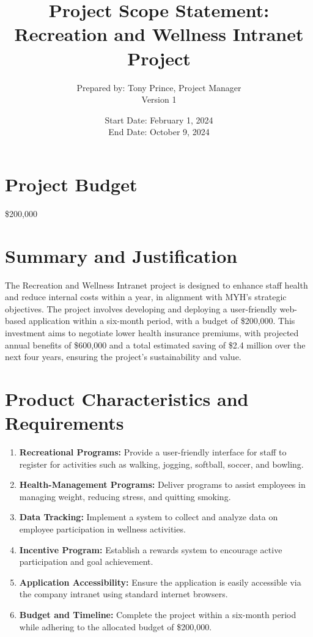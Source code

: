 \documentclass{article}
\title{Project Scope Statement: Recreation and Wellness Intranet Project}
\author{Prepared by: Tony Prince, Project Manager \\ Version 1}
\date{Start Date: February 1, 2024 \\ End Date: October 9, 2024}
\begin{document}
\maketitle

\section*{Project Budget}
\$200,000

\section*{Summary and Justification}
The Recreation and Wellness Intranet project is designed to enhance staff health and reduce internal costs within a year, in alignment with MYH's strategic objectives. The project involves developing and deploying a user-friendly web-based application within a six-month period, with a budget of \$200,000. This investment aims to negotiate lower health insurance premiums, with projected annual benefits of \$600,000 and a total estimated saving of \$2.4 million over the next four years, ensuring the project's sustainability and value.

\section*{Product Characteristics and Requirements}
\begin{enumerate}[label=\arabic*.]
    \item \textbf{Recreational Programs:} Provide a user-friendly interface for staff to register for activities such as walking, jogging, softball, soccer, and bowling.
    \item \textbf{Health-Management Programs:} Deliver programs to assist employees in managing weight, reducing stress, and quitting smoking.
    \item \textbf{Data Tracking:} Implement a system to collect and analyze data on employee participation in wellness activities.
    \item \textbf{Incentive Program:} Establish a rewards system to encourage active participation and goal achievement.
    \item \textbf{Application Accessibility:} Ensure the application is easily accessible via the company intranet using standard internet browsers.
    \item \textbf{Budget and Timeline:} Complete the project within a six-month period while adhering to the allocated budget of \$200,000.
\end{enumerate}
\end{document}
